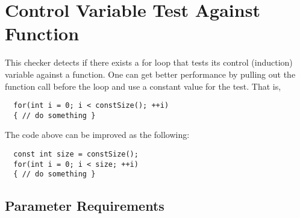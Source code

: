 %
%

\section{Control Variable Test Against Function}
\label{ControlVariableTestAgainstFunction::overview}

This checker detects if there exists a for loop that tests its control (induction) variable against a function. One can get better performance by pulling out the function call before the loop and use a constant value for the test. That is, 

\begin{verbatim}
  for(int i = 0; i < constSize(); ++i)
  { // do something }
\end{verbatim}

The code above can be improved as the following:

\begin{verbatim}
  const int size = constSize();
  for(int i = 0; i < size; ++i)
  { // do something }
\end{verbatim}


\subsection{Parameter Requirements}

